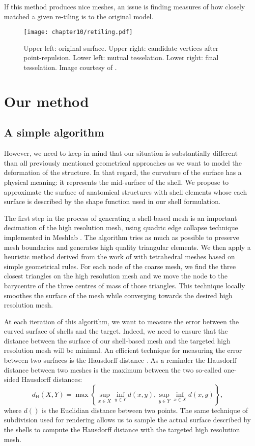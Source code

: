If this method produces nice meshes, an issue is finding measures of how closely matched a given re-tiling is to the original model. 
%
\begin{figure}
\centering
\texttt{[image: chapter10/retiling.pdf]}
\caption[Retiling technique]{Upper left: original surface. Upper right: candidate vertices after point-repulsion. Lower left: mutual tesselation. Lower right: final tesselation. Image courtesy of \cite{Turk92}.}
\label{chap10:fig-retiling}
\end{figure}


\section{Our method}

	\subsection{A simple algorithm}
	
However, we need to keep in mind that our situation is substantially different than all previously mentioned geometrical approaches as we want to model the deformation of the structure. In that regard, the curvature of the surface has a physical meaning: it represents the mid-surface of the shell. We propose to approximate the surface of anatomical structures with shell elements whose each surface is described by the shape function used in our shell formulation.

The first step in the process of generating a shell-based mesh is an important decimation of the high resolution mesh, using quadric edge collapse technique implemented in Meshlab \cite{Meshlab}. The algorithm tries as much as possible to preserve mesh boundaries and generates high quality triangular elements. We then apply a heuristic method derived from the work of \cite{Saupin07} with tetrahedral meshes based on simple geometrical rules. For each node of the coarse mesh, we find the three closest triangles on the high resolution mesh and we move the node to the barycentre of the three centres of mass of those triangles. This technique locally smoothes the surface of the mesh while converging towards the desired high resolution mesh. 

At each iteration of this algorithm, we want to measure the error between the curved surface of shells and the target. Indeed, we need to ensure that the distance between the surface of our shell-based mesh and the targeted high resolution mesh will be minimal. An efficient technique for measuring the error between two surfaces is the Hausdorff distance \citep{Klein96}. As a reminder the Hausdorff distance between two meshes is the maximum between the two so-called one-sided Hausdorff distances:
\begin{equation}
d_{\mathrm{H}}(X,Y) = \max \left\{ \sup_{x \in X} \inf_{y \in Y} d(x,y), \sup_{y \in Y} \inf_{x \in X} d(x,y) \right\},
\end{equation}
where $d()$ is the Euclidian distance between two points. The same technique of subdivision used for rendering allows us to sample the actual surface described by the shells to compute the Hausdorff distance with the targeted high resolution mesh. 

